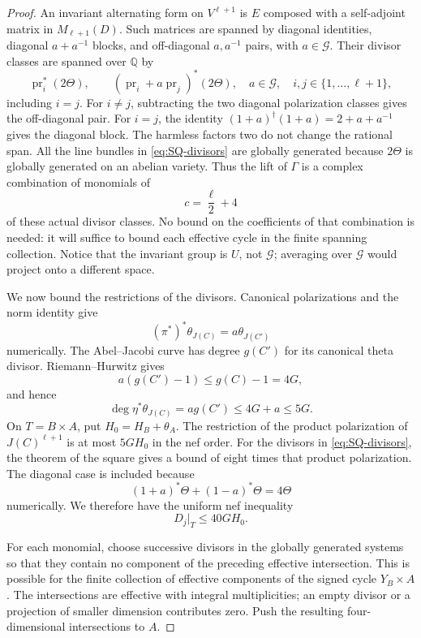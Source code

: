 \documentclass[11pt,a4paper]{article}
\theoremstyle{definition}\newtheorem{definition}[theorem]{Definition}
\theoremstyle{remark}\newtheorem{remark}[theorem]{Remark}
\newcommand{\Q}{\mathbb Q}\newcommand{\Z}{\mathbb Z}\newcommand{\C}{\mathbb C}\newcommand{\R}{\mathbb R}
\begin{document}
\begin{proof}
An invariant alternating form on $V^{\ell+1}$ is $E$ composed with a self-adjoint matrix in $M_{\ell+1}(D)$. Such matrices are spanned by diagonal identities, diagonal $a+a^{-1}$ blocks, and off-diagonal $a,a^{-1}$ pairs, with $a\in\mathcal G$. Their divisor classes are spanned over $\Q$ by
\begin{equation}\label{eq:SQ-divisors}
 \operatorname{pr}_i^*(2\Theta),\qquad
 (\operatorname{pr}_i+a\operatorname{pr}_j)^*(2\Theta),
 \quad a\in\mathcal G,\quad i,j\in\{1,\ldots,\ell+1\},
\end{equation}
including $i=j$. For $i\ne j$, subtracting the two diagonal polarization classes gives the off-diagonal pair. For $i=j$, the identity
$(1+a)^\dagger(1+a)=2+a+a^{-1}$ gives the diagonal block. The harmless factors two do not change the rational span. All the line bundles in \eqref{eq:SQ-divisors} are globally generated because $2\Theta$ is globally generated on an abelian variety. Thus the lift of $\Gamma$ is a complex combination of monomials of
\[
 c=\frac\ell2+4
\]
of these actual divisor classes. No bound on the coefficients of that combination is needed: it will suffice to bound each effective cycle in the finite spanning collection. Notice that the invariant group is $U$, not $\mathcal G$; averaging over $\mathcal G$ would project onto a different space.

We now bound the restrictions of the divisors. Canonical polarizations and the norm identity give
\[
 (\pi^*)^*\theta_{J(C)}=a\theta_{J(C')}
\]
numerically. The Abel--Jacobi curve has degree $g(C')$ for its canonical theta divisor. Riemann--Hurwitz gives
\[
 a(g(C')-1)\le g(C)-1=4G,
\]
and hence
\begin{equation}\label{eq:SQ-curvedegree}
 \deg\eta^*\theta_{J(C)}=a g(C')\le4G+a\le5G.
\end{equation}
On $T=B\times A$, put $H_0=H_B+\theta_A$. The restriction of the product polarization of $J(C)^{\ell+1}$ is at most $5GH_0$ in the nef order. For the divisors in \eqref{eq:SQ-divisors}, the theorem of the square gives a bound of eight times that product polarization. The diagonal case is included because
\[
 (1+a)^*\Theta+(1-a)^*\Theta=4\Theta
\]
numerically. We therefore have the uniform nef inequality
\begin{equation}\label{eq:SQ-nef}
 D_j|_T\le40G H_0.
\end{equation}

For each monomial, choose successive divisors in the globally generated systems so that they contain no component of the preceding effective intersection. This is possible for the finite collection of effective components of the signed cycle $Y_B\times A$. The intersections are effective with integral multiplicities; an empty divisor or a projection of smaller dimension contributes zero. Push the resulting four-dimensional intersections to $A$.


\end{proof}
\end{document}
